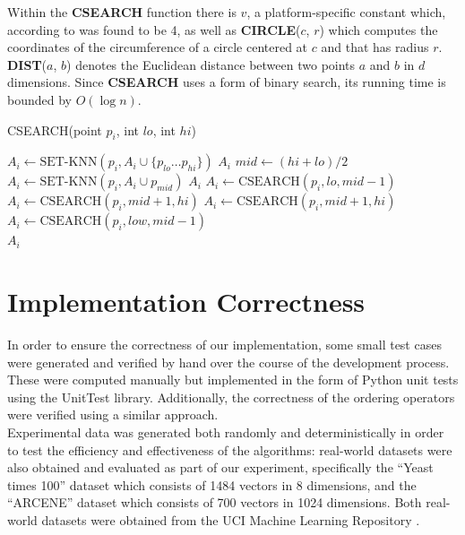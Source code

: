 \documentclass[10pt]{article}
\begin{document}
Within the {\bf CSEARCH} function there is $v$, a platform-specific constant which, according to \cite{Connor:2010} was found to be 4, as well as {\bf CIRCLE}($c$, $r$) which computes the coordinates of the circumference of a circle centered at $c$ and that has radius $r$. {\bf DIST}($a$, $b$) denotes the Euclidean distance between two points $a$ and $b$ in $d$ dimensions. Since {\bf CSEARCH} uses a form of binary search, its running time is bounded by $O(\log{n})$.

\begin{algorithm}[H]
  \caption{CSEARCH(point $p_i$, int $lo$, int $hi$)}
  \label{csearch}
  \begin{algorithmic}[1]
    \State $A_i \leftarrow \text{SET-KNN}(p_i, A_i \cup \{ p_{lo} \dots p_{hi} \})$
    \Return $A_i$
    \EndIf
    \State $mid \leftarrow (hi+lo)/2$
    \State $A_i \leftarrow \text{SET-KNN}(p_i, A_i \cup p_{mid})$
    \Return $A_i$
    \EndIf
    \State $A_i \leftarrow \text{CSEARCH}(p_i, lo, mid-1)$
    \State $A_i \leftarrow \text{CSEARCH}(p_i, mid+1, hi)$
    \EndIf
    \Else
    \State $A_i \leftarrow \text{CSEARCH}(p_i, mid+1, hi)$
    \State $A_i \leftarrow \text{CSEARCH}(p_i, low, mid - 1)$
    \EndIf
    \EndIf \\
    \Return $A_i$
    
  \end{algorithmic}
\end{algorithm}

\section{Implementation Correctness}

In order to ensure the correctness of our implementation, some small test cases were generated and verified by hand over the course of the development process. These were computed manually but implemented in the form of Python unit tests using the UnitTest library. Additionally, the correctness of the ordering operators were verified using a similar approach. \\[10pt]

Experimental data was generated both randomly and deterministically in order to test the efficiency and effectiveness of the algorithms: real-world datasets were also obtained and evaluated as part of our experiment, specifically the ``Yeast times 100'' dataset which consists of 1484 vectors in 8 dimensions, and the ``ARCENE'' dataset \cite{ARCENE:2004} which consists of 700 vectors in 1024 dimensions. Both real-world datasets were obtained from the UCI Machine Learning Repository \cite{UCI:2013}. \\[10pt]
\end{document}
